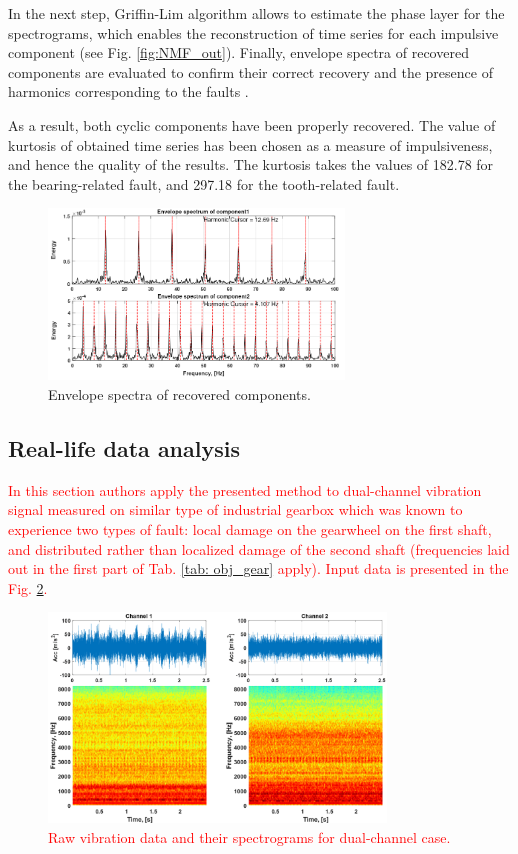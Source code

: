 \documentclass[3p,12pt]{elsarticle}
\begin{document}
In the next step, Griffin-Lim algorithm allows to estimate the phase layer for the spectrograms, which enables the reconstruction of time series for each impulsive component (see Fig. \ref{fig:NMF_out}). Finally, envelope spectra of recovered components are evaluated to confirm their correct recovery and the presence of harmonics corresponding to the faults \cite{randall2011vibration}.

As a result, both cyclic components have been properly recovered. The value of kurtosis of obtained time series has been chosen as a measure of impulsiveness, and hence the quality of the results. The kurtosis takes the values of 182.78 for the bearing-related fault, and 297.18 for the tooth-related fault.

\begin{figure}[ht!]
\centering
\includegraphics[width=0.7\textwidth]{figs/spec.png}
\caption{Envelope spectra of recovered components.}
\label{fig:spec}
\end{figure}

\subsection{Real-life data analysis}

\textcolor{red}{In this section authors apply the presented method to dual-channel vibration signal measured on similar type of industrial gearbox which was known to experience two types of fault: local damage on the gearwheel on the first shaft, and distributed rather than localized damage of the second shaft (frequencies laid out in the first part of Tab. \ref{tab: obj_gear} apply). Input data is presented in the Fig. \ref{fig:input2}.} 

\begin{figure}[ht!]
\centering
\includegraphics[width=0.8\textwidth]{figs/input2.png}
\caption{\textcolor{red}{Raw vibration data and their spectrograms for dual-channel case.}}
\label{fig:input2}
\end{figure}
\end{document}
